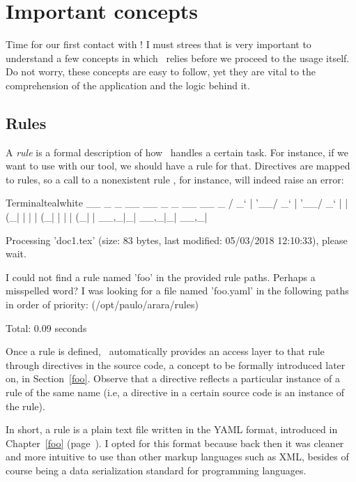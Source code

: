 \chapter{Important concepts}
\label{chap:importantconcepts}

Time for our first contact with \arara! I must strees that is very important to understand a few concepts in which \arara\ relies before we proceed to the usage itself. Do not worry, these concepts are easy to follow, yet they are vital to the comprehension of the application and the logic behind it.

\section{Rules}
\label{sec:rule}

A \emph{rule} is a formal description of how \arara\ handles a certain task. For instance, if we want to use  with our tool, we should have a rule for that. Directives are mapped to rules, so a call to a nonexistent rule , for instance, will indeed raise an error:

\begin{codebox}{Terminal}{teal}{\icnote}{white}
  __ _ _ __ __ _ _ __ __ _ 
 / _` | '__/ _` | '__/ _` |
| (_| | | | (_| | | | (_| |
 \__,_|_|  \__,_|_|  \__,_|

Processing 'doc1.tex' (size: 83 bytes, last modified: 05/03/2018
12:10:33), please wait.

I could not find a rule named 'foo' in the provided rule paths.
Perhaps a misspelled word? I was looking for a file named
'foo.yaml' in the following paths in order of priority:
(/opt/paulo/arara/rules)

Total: 0.09 seconds
\end{codebox}

Once a rule is defined, \arara\ automatically provides an access layer to that rule through directives in the source code, a concept to be formally introduced later on, in Section~\ref{foo}. Observe that a directive reflects a particular instance of a rule of the same name (i.e, a  directive in a certain source code is an instance of the  rule).

In short, a rule is a plain text file written in the YAML format, introduced in Chapter~\ref{foo} (page~\pageref{foo}). I opted for this format because back then it was cleaner and more intuitive to use than other markup languages such as XML, besides of course being a data serialization standard for programming languages.

